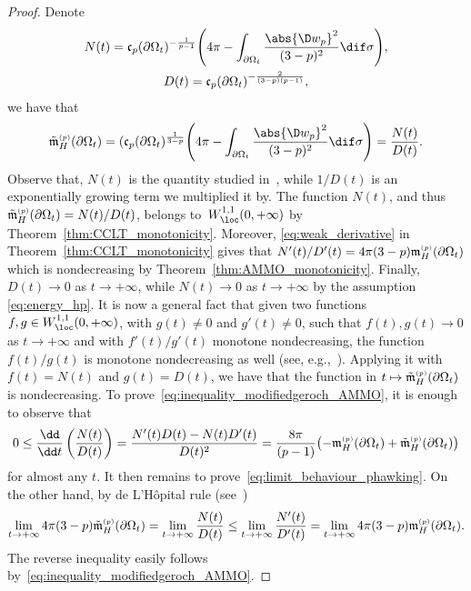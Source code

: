 \documentclass[10pt,a4paper]{amsart}
\numberwithin{equation}{section}
\renewcommand{\ncapa}{\mathfrak{c}}
\newcommand{\ma}{\mathfrak{m}}
\newcommand{\tp}[1][p]{{\text{\tiny$(#1)$}}}
\begin{document}
\begin{proof}
Denote
\begin{gather*}
 N(t) =\ncapa_p(\partial \Omega_t)^{-\frac{1}{p-1}}\Bigg( 4 \pi - \int_{\partial \Omega_t} \frac{\abs{ \D w_p}^2}{(3-p)^2} \dif \sigma\Bigg), \\
 D(t)= \ncapa_p(\partial \Omega_t)^{-\frac{2}{(3-p)(p-1)}},
\end{gather*}
we have that
\[
 \tilde{\ma}^{\tp}_H(\partial \Omega_t)=(\ncapa_p(\partial \Omega_t)^{\frac{1}{3-p}}\Bigg( 4 \pi - \int_{\partial \Omega_t} \frac{\abs{ \D w_p}^2}{(3-p)^2} \dif \sigma\Bigg) =\frac{N(t)}{D(t)}.
\]
Observe that, $N(t)$ is the quantity studied in~\cite{chan_monotonicitygreenfunctions_2022,munteanu_comparisontheorems3dmanifolds_2023}, while $1/D(t)$ is an exponentially growing term we multiplied it by. The function $N(t)$, and thus $\tilde{\ma}^{\tp}_H(\partial \Omega_t)=N(t)/D(t)$, belongs to~$W^{1,1}_{\loc}(0,+\infty)$ by Theorem~\ref{thm:CCLT_monotonicity}. Moreover,
\eqref{eq:weak_derivative} in Theorem~\ref{thm:CCLT_monotonicity} gives that $N'(t)/D'(t) = 4\pi (3-p)\ma_{H}^{\tp}(\partial \Omega_t)$ which is nondecreasing by Theorem~\ref{thm:AMMO_monotonicity}. Finally, $D(t)\to 0$ as $t \to +\infty$, while $N(t) \to 0$ as $t \to +\infty$ by the assumption \eqref{eq:energy_hp}. It is now a general fact that given two functions $f,g\in W^{1,1}_{\loc}(0,+\infty)$, with $g(t)\neq 0$ and $g'(t)\neq 0$, such that $f(t),g(t)\to 0$ as $t \to +\infty$ and with $f'(t)/g'(t)$ monotone nondecreasing, the function $f(t)/g(t)$ is monotone nondecreasing as well (see, e.g.,~\cite[Lemma 3.2]{zhu_comparisongeometryriccicurvature_1997}). Applying it with $f(t)=N(t)$ and $g(t)=D(t)$, we have that the function in $t \mapsto \tilde{\ma}^{\tp}_H(\partial \Omega_t)$ is nondecreasing. To prove~\eqref{eq:inequality_modifiedgeroch_AMMO}, it is enough to observe that
\[
 0\leq \frac{ \dd }{\dd t} \left( \frac{N(t)}{D(t)}\right) = \frac{N'(t)D(t) - N(t)D'(t)}{D(t)^2} = \frac{8 \pi}{(p-1)}\bigl(-\ma^{\tp}_H(\partial \Omega_t) + \tilde{\ma}^{\tp}_{H}(\partial \Omega_t)\bigr)
\]
for almost any $t$.
It then remains to prove~\eqref{eq:limit_behaviour_phawking}. On the other hand, by de L'H\^opital rule (see~\cite[Theorem A.1]{benatti_isoperimetricriemannianpenroseinequality_2022})
\[
 \lim_{t \to +\infty} 4\pi (3-p) \tilde{\ma}^{\tp}_H(\partial \Omega_t)= \lim_{t \to +\infty} \frac{N(t)}{D(t)} \leq \lim_{t \to +\infty} \frac{N'(t)}{D'(t)} = \lim_{t \to +\infty} 4 \pi (3-p) \ma_H^{\tp}(\partial \Omega_t).
\]
The reverse inequality easily follows by~\eqref{eq:inequality_modifiedgeroch_AMMO}. \end{proof}
\end{document}
